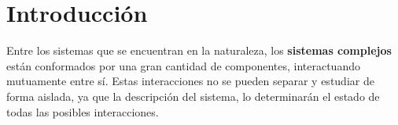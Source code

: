 \chapter{Introducción}


Entre los sistemas que se encuentran en la naturaleza, los \textbf{sistemas complejos} están conformados por una gran cantidad de componentes, interactuando mutuamente entre sí. Estas interacciones no se pueden separar y estudiar de forma aislada, ya que la descripción del sistema, lo determinarán el estado de todas las posibles interacciones. 






